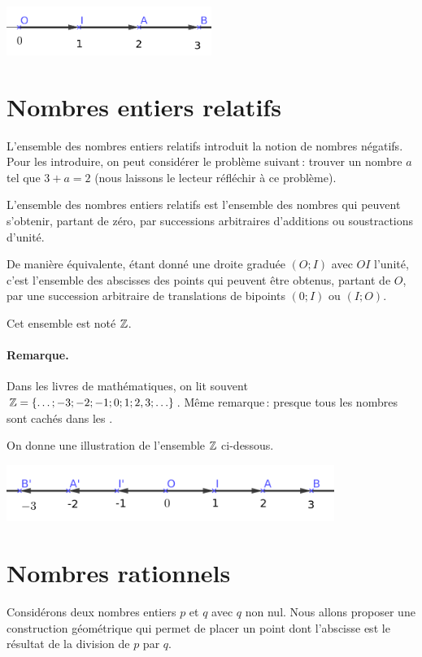 		\includegraphics[width=0.5\textwidth]{image/calcul/ens_N.png} 

	\section{Nombres entiers relatifs}
		L'ensemble des nombres entiers relatifs introduit la notion de nombres négatifs. Pour les introduire, on peut considérer le problème suivant\,: trouver un nombre $a$ tel que $3+a=2$ (nous laissons le lecteur réfléchir à ce problème).

		\begin{defi}
			L'ensemble des nombres entiers relatifs est l'ensemble des nombres qui peuvent s'obtenir, partant de zéro, par successions arbitraires d'additions ou soustractions d'unité.

			De manière équivalente, étant donné une droite graduée $(O;I)$ avec $OI$ l'unité, c'est l'ensemble des abscisses des points qui peuvent être obtenus, partant de $O$, par une succession arbitraire de translations de bipoints $(0;I)$ ou $(I;O)$.

			Cet ensemble est noté $\mathbb{Z}$.
		\end{defi} 

		\paragraph{Remarque.} Dans les livres de mathématiques, on lit souvent \\ $\mathbb{Z}=\{\ldots;-3;-2;-1;0;1;2,3;\ldots\}$. Même remarque\,: presque tous les nombres sont cachés dans les \guil{\ldots}.

		\vspace{0.3cm}

		On donne une illustration de l'ensemble $\mathbb{Z}$ ci-dessous.

		\includegraphics[width=0.8\textwidth]{image/calcul/ens_Z.png}


	\section{Nombres rationnels}
		Considérons deux nombres entiers $p$ et $q$ avec $q$ non nul. Nous allons proposer une construction géométrique qui permet de placer un point dont l'abscisse est le résultat de la division de $p$ par $q$.

